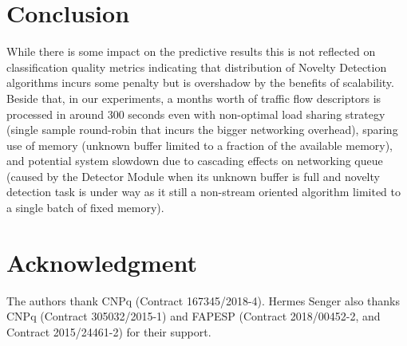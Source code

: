
\section{Conclusion} 
\label{sec:conclusion}

While there is some impact on the predictive results this is not reflected on
classification quality metrics indicating that distribution of Novelty Detection
algorithms incurs some penalty but is overshadow by the benefits of scalability.
Beside that, in our experiments, a months worth of traffic flow descriptors is
processed in around $300$ seconds even with non-optimal load sharing strategy
(single sample round-robin that incurs the bigger networking overhead),
sparing use of memory (unknown buffer limited to a fraction of the available memory),
and potential system slowdown due to cascading effects on networking queue
(caused by the Detector Module when its unknown buffer is full and novelty
detection task is under way as it still a non-stream oriented algorithm limited
to a single batch of fixed memory).


\section*{Acknowledgment}

The authors thank CNPq (Contract 167345/2018-4).
Hermes Senger also thanks CNPq (Contract 305032/2015-1) and FAPESP (Contract
2018/00452-2, and Contract 2015/24461-2) for their support.
